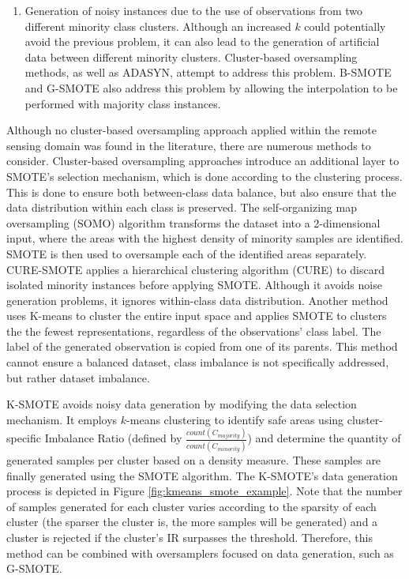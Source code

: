\documentclass[parskip=full]{scrartcl}
\begin{document}
\begin{enumerate}
	\item Generation of noisy instances due to the use of observations from two different
	      minority class clusters. Although an increased $k$ could
	      potentially avoid the previous problem, it can also lead to the generation of
	      artificial data between different minority clusters. Cluster-based oversampling
	      methods, as well as ADASYN, attempt to address this problem. B-SMOTE
	      \cite{Han2005} and G-SMOTE also address this problem by allowing the
	      interpolation to be performed with majority class instances.
\end{enumerate}

Although no cluster-based oversampling approach applied within the remote
sensing domain was found in the literature, there are numerous methods to
consider. Cluster-based oversampling approaches introduce an additional layer
to SMOTE's selection mechanism, which is done according to the clustering
process. This is done to ensure both between-class data balance, but also
ensure that the data distribution within each class is preserved. The
self-organizing map oversampling (SOMO) \cite{Douzas2017} algorithm
transforms the dataset into a 2-dimensional input, where the areas with the
highest density of minority samples are identified. SMOTE is then used to
oversample each of the identified areas separately. CURE-SMOTE
\cite{Ma2017} applies a hierarchical clustering algorithm (CURE) to
discard isolated minority instances before applying SMOTE. Although it avoids
noise generation problems, it ignores within-class data distribution. Another
method \cite{Santos2015} uses K-means to cluster the entire input space
and applies SMOTE to clusters the the fewest representations, regardless of the
observations' class label. The label of the generated observation is copied
from one of its parents. This method cannot ensure a balanced dataset, class
imbalance is not specifically addressed, but rather dataset imbalance.

K-SMOTE \cite{Douzas2018} avoids noisy data generation by modifying the
data selection mechanism. It employs $k$-means clustering to
identify safe areas using cluster-specific Imbalance Ratio (defined by
$\frac{count(C_{majority})}{count(C_{minority})}$) and determine the quantity of generated samples per
cluster based on a density measure. These samples are finally generated using
the SMOTE algorithm. The K-SMOTE's data generation process is depicted in
Figure \ref{fig:kmeans_smote_example}. Note that the number of samples generated for
each cluster varies according to the sparsity of each cluster (the sparser the
cluster is, the more samples will be generated) and a cluster is rejected if
the cluster's IR surpasses the threshold. Therefore, this method can be
combined with oversamplers focused on data generation, such as G-SMOTE.
\end{document}

